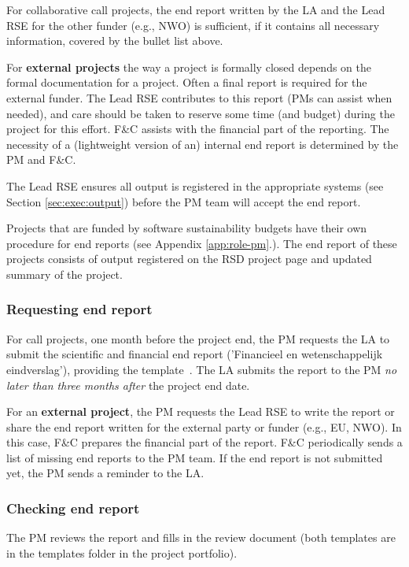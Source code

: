 For collaborative call projects, the end report written by the LA and the Lead RSE for the other funder (e.g., NWO) is
sufficient, if it contains all necessary information, covered by the bullet list above.

For \textbf{external projects} the way a project is formally closed depends on the formal documentation for a project.
Often a final report is required for the external funder. The Lead RSE contributes to this report (PMs can assist when
needed), and care should be taken to reserve some time (and budget) during the project for this effort. F\&C assists
with the financial part of the reporting. The necessity of a (lightweight version of an) internal end report is
determined by the PM and F\&C.

The Lead RSE ensures all output is registered in the appropriate systems (see Section \ref{sec:exec:output}) before the
PM team will accept the end report.

Projects that are funded by software sustainability budgets have their own procedure for end reports (see Appendix
\ref{app:role-pm}.). The end report of these projects consists of output registered on the RSD project page and
updated summary of the project.



\subsubsection{Requesting end report}
For call projects, one month before the project end, the PM requests the LA to submit the scientific and financial end
report ('Financieel en wetenschappelijk eindverslag'), providing the
template~\cite{proj-templates}. The LA submits the report to the PM \textit{no later than three months after} the project end date.


For an \textbf{external project}, the PM requests the Lead RSE to write the report or share the end report written for
the external party or funder (e.g., EU, NWO). In this case, F\&C prepares the financial part of the report. F\&C
periodically sends a list of missing end reports to the PM team. If the end report is not submitted yet, the PM sends a
reminder to the LA.

\subsubsection{Checking end report}
The PM reviews the report and fills in the review document (both templates are in the templates folder in the project
portfolio).


